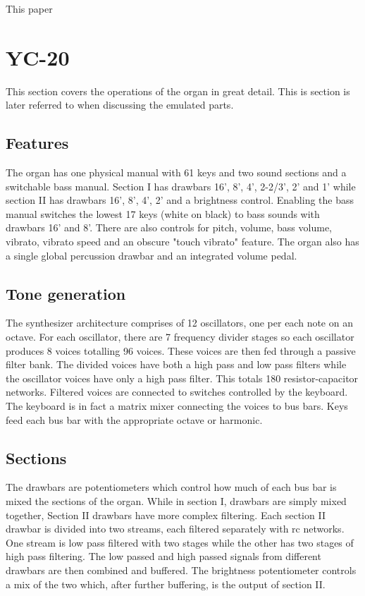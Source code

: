 \documentclass[11pt,a4paper]{article}
\begin{document}
This paper 


\section{YC-20}
\label{section:yc-20}

This section covers the operations of the organ in great detail. This is section is later referred to when discussing the emulated parts.

\subsection{Features}

The organ has one physical manual with 61 keys and two sound sections and a switchable bass manual. Section I has drawbars 16', 8', 4', 2-2/3', 2' and 1' while section II has drawbars 16', 8', 4', 2' and a brightness control. Enabling the bass manual switches the lowest 17 keys (white on black) to bass sounds with drawbars 16' and 8'. There are also controls for pitch, volume, bass volume, vibrato, vibrato speed and an obscure "touch vibrato" feature. The organ also has a single global percussion drawbar and an integrated volume pedal.

\subsection{Tone generation}

The synthesizer architecture comprises of 12 oscillators, one per each note on an octave. For each oscillator, there are 7 frequency divider stages so each oscillator produces 8 voices totalling 96 voices. These voices are then fed through a passive filter bank. The divided voices have both a high pass and low pass filters while the oscillator voices have only a high pass filter. This totals 180 resistor-capacitor networks. Filtered voices are connected to switches controlled by the keyboard. The keyboard is in fact a matrix mixer connecting the voices to bus bars. Keys feed each bus bar with the appropriate octave or harmonic.

\subsection{Sections}

The drawbars are potentiometers which control how much of each bus bar is mixed the sections of the organ. While in section I, drawbars are simply mixed together, Section II drawbars have more complex filtering. Each section II drawbar is divided into two streams, each filtered separately with rc networks. One stream is low pass filtered with two stages while the other has two stages of high pass filtering. The low passed and high passed signals from different drawbars are then combined and buffered. The brightness potentiometer controls a mix of the two which, after further buffering, is the output of section II. 
\end{document}
